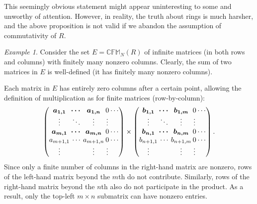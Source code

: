 \documentclass{article}
\newif\ifusemulticols
\theoremstyle{definition}
\theoremstyle{remark}
\newtheorem{example}{Example}[section]
\theoremstyle{plain}
\theoremstyle{plain}
\newenvironment{mymulticols}
    { \ifusemulticols \begin{multicols}{2} \fi }
    { \ifusemulticols \end{multicols} \fi }
\begin{document}
\begin{mymulticols}
This seemingly obvious statement might appear uninteresting to some and unworthy of attention.
However, in reality, the truth about rings is much harsher, and the above proposition is not valid
if we abandon the assumption of commutativity of $R$.

\begin{example}
    \label{example:rank_anomaly}
    Consider the set $E = \mathbb{CFM}_N(R)$ of infinite matrices (in both rows and columns) with
    finitely many nonzero columns. Clearly, the sum of two matrices in $E$ is well-defined (it has
    finitely many nonzero columns).

    Each matrix in $E$ has entirely zero columns after a certain point, allowing the definition of
    multiplication as for finite matrices (row-by-column):
    \begin{equation*}
        \arraycolsep=1pt
        \begin{pmatrix}
            \boldsymbol{a_{1,1}} & \boldsymbol{\cdots} & \boldsymbol{a_{1,n}} & 0 & \cdots\\
            \boldsymbol{\vdots} & \boldsymbol{\ddots} & \boldsymbol{\vdots} & \vdots\\
            \boldsymbol{a_{m,1}} & \boldsymbol{\cdots} & \boldsymbol{a_{m,n}} & 0 & \cdots\\
            a_{m+1,1} & \cdots & a_{m+1,n} & 0 & \cdots\\
            \vdots & & \vdots & \vdots
        \end{pmatrix}
        \times
        \begin{pmatrix}
            \boldsymbol{b_{1,1}} & \boldsymbol{\cdots} & \boldsymbol{b_{1,m}} & 0 & \cdots\\
            \boldsymbol{\vdots} & \boldsymbol{\ddots} & \boldsymbol{\vdots} & \vdots\\
            \boldsymbol{b_{n,1}} & \boldsymbol{\cdots} & \boldsymbol{b_{n,m}} & 0 & \cdots\\
            b_{n+1,1} & \cdots & b_{n+1,m} & 0 & \cdots\\
            \vdots & & \vdots & \vdots
        \end{pmatrix}.
    \end{equation*}
    Since only a finite number of columns in the right-hand matrix are nonzero, rows of the
    left-hand matrix beyond the $m$th do not contribute. Similarly, rows of the right-hand matrix
    beyond the $n$th also do not participate in the product. As a result, only the top-left $m
    \times n$ submatrix can have nonzero entries.


\end{example}
\end{mymulticols}
\end{document}
